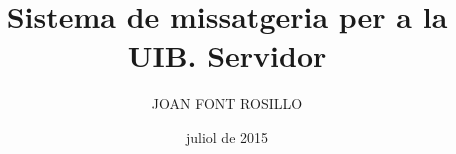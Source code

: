 \documentclass[catalan,GINF]{TFGEPSUIB}
\title{Sistema de missatgeria per a la UIB. Servidor}
\author{\MakeUppercase{Joan Font Rosillo}}
\date{juliol de 2015}
\begin{document}
\portada
\frontmatter

\cleartorecto \thispagestyle{empty}
\begin{agraiments}

\end{agraiments}

\cleartorecto \tableofcontents
\cleartorecto \listoffigures
\cleartorecto \listoftables 

 

 
\mainmatter\pagestyle{ruled}







\appendix 



\backmatter



 
\end{document}
